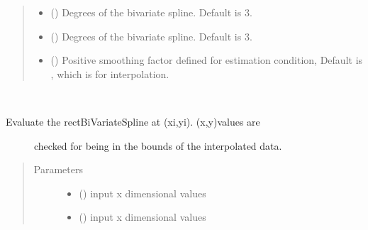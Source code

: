 \documentclass[letterpaper,10pt,english]{sphinxmanual}
\begin{document}
\begin{fulllineitems}
\begin{quote}
\begin{description}
\begin{itemize}
\item {} 
 () \textendash{} Degrees of the bivariate spline. Default is 3.

\item {} 
 () \textendash{} Degrees of the bivariate spline. Default is 3.

\item {} 
 () \textendash{} Positive smoothing factor defined for estimation condition,
Default is , which is for interpolation.

\end{itemize}

\end{description}\end{quote}

\begin{fulllineitems}
\label{\detokenize{eqtools:eqtools.trispline.RectBivariateSpline.ev}}~\begin{description}
\item[{Evaluate the rectBiVariateSpline at (xi,yi).  (x,y)values are}] \leavevmode
checked for being in the bounds of the interpolated data.

\end{description}
\begin{quote}\begin{description}
\item[{Parameters}] \leavevmode\begin{itemize}
\item {} 
 () \textendash{} input x dimensional values

\item {} 
 () \textendash{} input x dimensional values


\end{itemize}
\end{description}
\end{quote}
\end{fulllineitems}
\end{fulllineitems}
\end{document}
